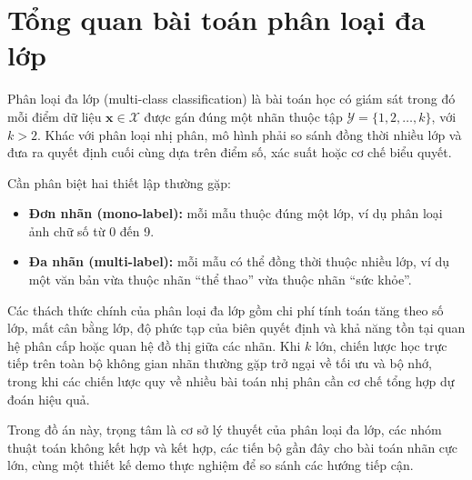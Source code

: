 \section{Tổng quan bài toán phân loại đa lớp}

Phân loại đa lớp (multi-class classification) là bài toán học có giám sát trong đó mỗi điểm dữ liệu $\bm{x}\in\mathcal{X}$ được gán đúng một nhãn thuộc tập $\mathcal{Y}=\{1,2,\ldots,k\}$, với $k>2$. Khác với phân loại nhị phân, mô hình phải so sánh đồng thời nhiều lớp và đưa ra quyết định cuối cùng dựa trên điểm số, xác suất hoặc cơ chế biểu quyết.

Cần phân biệt hai thiết lập thường gặp:
\begin{itemize}[leftmargin=2em]
  \item \textbf{Đơn nhãn (mono-label):} mỗi mẫu thuộc đúng một lớp, ví dụ phân loại ảnh chữ số từ 0 đến 9.
  \item \textbf{Đa nhãn (multi-label):} mỗi mẫu có thể đồng thời thuộc nhiều lớp, ví dụ một văn bản vừa thuộc nhãn ``thể thao'' vừa thuộc nhãn ``sức khỏe''.
\end{itemize}

Các thách thức chính của phân loại đa lớp gồm chi phí tính toán tăng theo số lớp, mất cân bằng lớp, độ phức tạp của biên quyết định và khả năng tồn tại quan hệ phân cấp hoặc quan hệ đồ thị giữa các nhãn. Khi $k$ lớn, chiến lược học trực tiếp trên toàn bộ không gian nhãn thường gặp trở ngại về tối ưu và bộ nhớ, trong khi các chiến lược quy về nhiều bài toán nhị phân cần cơ chế tổng hợp dự đoán hiệu quả.

\begin{notebox}
Trong đồ án này, trọng tâm là cơ sở lý thuyết của phân loại đa lớp, các nhóm thuật toán không kết hợp và kết hợp, các tiến bộ gần đây cho bài toán nhãn cực lớn, cùng một thiết kế demo thực nghiệm để so sánh các hướng tiếp cận.
\end{notebox}